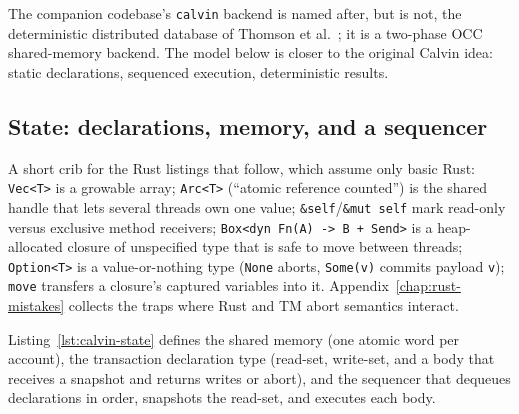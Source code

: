 The companion codebase's \texttt{calvin} backend is named after, but is not, the deterministic distributed database of Thomson et al.~\cite{thomson12calvin}; it is a two-phase OCC shared-memory backend. The model below is closer to the original Calvin idea: static declarations, sequenced execution, deterministic results.

\subsection{State: declarations, memory, and a sequencer}

A short crib for the Rust listings that follow, which assume only basic
Rust: \texttt{Vec<T>} is a growable array; \texttt{Arc<T>} (``atomic
reference counted'') is the shared handle that lets several threads own one
value; \texttt{\&self}/\texttt{\&mut self} mark read-only versus exclusive
method receivers; \texttt{Box<dyn Fn(A) -> B + Send>} is a heap-allocated
closure of unspecified type that is safe to move between threads; \texttt{Option<T>}
is a value-or-nothing type (\texttt{None} aborts, \texttt{Some(v)} commits
payload \texttt{v}); \texttt{move} transfers a closure's captured variables
into it. Appendix~\ref{chap:rust-mistakes} collects the traps where Rust and
TM abort semantics interact.

Listing~\ref{lst:calvin-state} defines the shared memory (one atomic word per account), the transaction declaration type (read-set, write-set, and a body that receives a snapshot and returns writes or abort), and the sequencer that dequeues declarations in order, snapshots the read-set, and executes each body.

